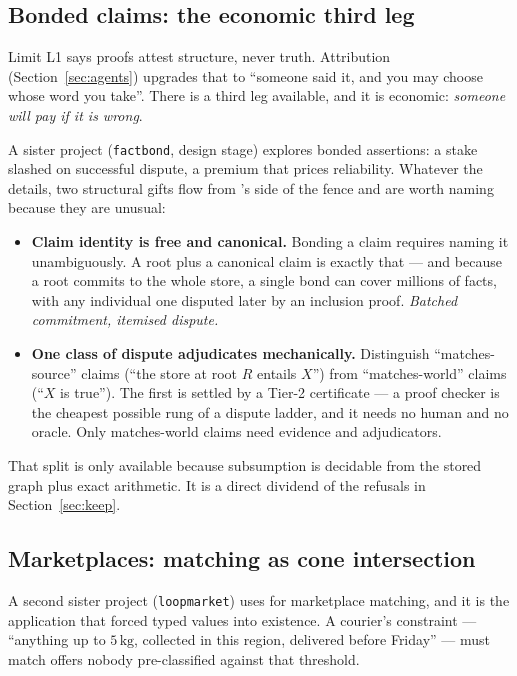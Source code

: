 \subsection{Bonded claims: the economic third leg}
\label{sec:crypto-bonds}

Limit L1 says proofs attest structure, never truth. Attribution
(Section~\ref{sec:agents}) upgrades that to ``someone said it, and you may
choose whose word you take''. There is a third leg available, and it is
economic: \emph{someone will pay if it is wrong}.

A sister project (\texttt{factbond}, design stage) explores bonded assertions:
a stake slashed on successful dispute, a premium that prices reliability.
Whatever the details, two structural gifts flow from \odag{}'s side of the
fence and are worth naming because they are unusual:

\begin{itemize}[leftmargin=1.4em]
\item \textbf{Claim identity is free and canonical.} Bonding a claim requires
  naming it unambiguously. A root plus a canonical claim is exactly that ---
  and because a root commits to the whole store, a single bond can cover
  millions of facts, with any individual one disputed later by an inclusion
  proof. \emph{Batched commitment, itemised dispute.}
\item \textbf{One class of dispute adjudicates mechanically.} Distinguish
  ``matches-source'' claims (``the store at root $R$ entails $X$'') from
  ``matches-world'' claims (``$X$ is true''). The first is settled by a Tier-2
  certificate --- a proof checker is the cheapest possible rung of a dispute
  ladder, and it needs no human and no oracle. Only matches-world claims need
  evidence and adjudicators.
\end{itemize}

That split is only available because subsumption is decidable from the stored
graph plus exact arithmetic. It is a direct dividend of the refusals in
Section~\ref{sec:keep}.

\subsection{Marketplaces: matching as cone intersection}

A second sister project (\texttt{loopmarket}) uses \odag{} for marketplace
matching, and it is the application that forced typed values into existence.
A courier's constraint --- ``anything up to $5\,\mathrm{kg}$, collected in
this region, delivered before Friday'' --- must match offers nobody
pre-classified against that threshold.

